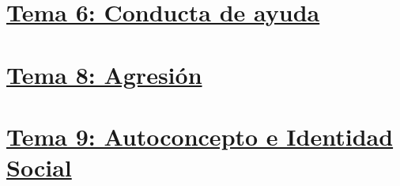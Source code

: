 \documentclass[
]{book}
\begin{document}
\chapter{\texorpdfstring{\href{https://dalarconrub.github.io/psicologia-social-tema-6/}{Tema 6: Conducta de ayuda}}{Tema 6: Conducta de ayuda}}\label{tema-6-conducta-de-ayuda}

\chapter{\texorpdfstring{\href{https://dalarconrub.github.io/psicologia-social-tema-8/}{Tema 8: Agresión}}{Tema 8: Agresión}}\label{tema-8-agresiuxf3n}

\chapter{\texorpdfstring{\href{https://dalarconrub.github.io/psicologia-social-tema-9/}{Tema 9: Autoconcepto e Identidad Social}}{Tema 9: Autoconcepto e Identidad Social}}\label{tema-9-autoconcepto-e-identidad-social}
\end{document}
